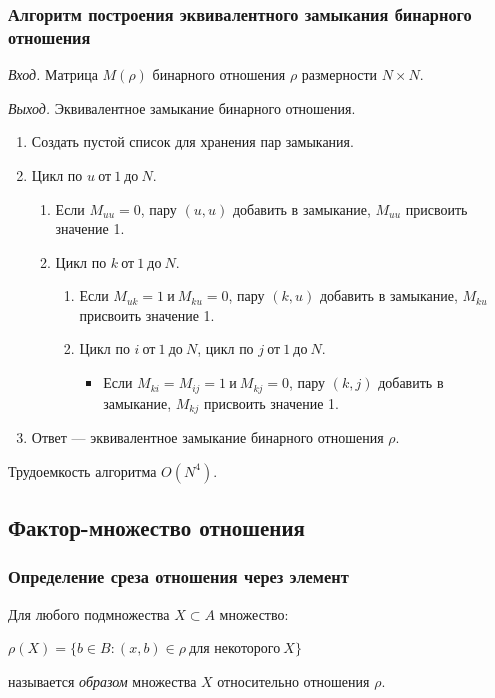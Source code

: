 \documentclass[bachelor, och, labwork]{shiza}
\begin{document}
\subsubsection{Алгоритм построения эквивалентного замыкания бинарного отношения}

\textit{Вход.} Матрица $M(\rho)$ бинарного отношения $\rho$ размерности
$N \times N$.

\textit{Выход.} Эквивалентное замыкание бинарного отношения.

\begin{enumerate}
    \item Создать пустой список для хранения пар замыкания.

    \item Цикл по $u ~\text{от}~ 1 ~\text{до}~ N$.
        \begin{enumerate}
            \item Если $M_{uu} = 0$, пару $(u, u)$ добавить в замыкание, $M_{uu}$ присвоить значение  1.
            \item Цикл по $k ~\text{от}~ 1 ~\text{до}~ N$.
                \begin{enumerate}
                    \item Если $M_{uk} = 1 ~\text{и}~ M_{ku} = 0 $, пару $(k, u)$ добавить в замыкание, $M_{ku}$ присвоить значение 1.
                    \item Цикл по $i ~\text{от}~ 1 ~\text{до}~ N$, цикл по $j ~\text{от}~ 1 ~\text{до}~ N$.
                        \begin{itemize}[label=1.]
                            \item Если $M_{ki} = M_{ij} = 1 ~\text{и}~ M_{kj} = 0$, пару $(k, j)$ добавить в замыкание, $M_{kj}$ присвоить значение 1.
                        \end{itemize} 
                \end{enumerate} 
        \end{enumerate}

    \item Ответ --- эквивалентное замыкание бинарного отношения $\rho$.
\end{enumerate}
Трудоемкость алгоритма $O(N^4)$.

\subsection{Фактор-множество отношения}

\subsubsection{Определение среза отношения через элемент}
Для любого подмножества $X \subset A$ множество:
\begin{center} $\rho(X)=\{b \in B:(x,b)\in \rho ~\text{для некоторого}~ X\}$ \end{center}
называется \textit{образом} множества $X$ относительно отношения $\rho$.
\end{document}
